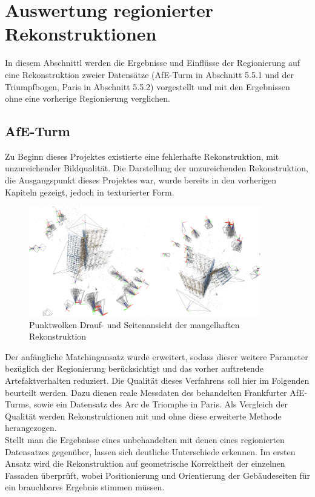 \section{Auswertung regionierter Rekonstruktionen}

In diesem Abschnittl werden die Ergebnisse und Einfl\"usse der Regionierung  auf eine Rekonstruktion zweier Datens\"atze (AfE-Turm in Abschnitt 5.5.1 und der Triumpfbogen, Paris in Abschnitt 5.5.2) vorgestellt und mit den Ergebnissen ohne eine vorherige Regionierung verglichen.

\subsection{AfE-Turm}
Zu Beginn dieses Projektes existierte eine fehlerhafte Rekonstruktion, mit unzureichender Bildqualit\"at. Die Darstellung der unzureichenden Rekonstruktion, die Ausgangspunkt dieses Projektes war, wurde bereits in den vorherigen Kapiteln gezeigt, jedoch in texturierter Form.

\begin{figure}[h]
\centering
\includegraphics[width=0.9\textwidth]{gfx/Evaluation/prePointcloud_AfEboth.png}
\caption[Punktwolken Drauf- und Seitenansicht der mangelhaften Rekonstruktion]{Punktwolken Drauf- und Seitenansicht der mangelhaften Rekonstruktion}
\label{gr:seitefehler}
\end{figure}
\FloatBarrier

Der anf\"angliche Matchingansatz wurde erweitert, sodass dieser weitere Parameter bez\"uglich der Regionierung ber\"ucksichtigt und das vorher auftretende Artefaktverhalten reduziert. Die Qualit\"at dieses Verfahrens soll hier im Folgenden beurteilt werden. Dazu dienen reale Messdaten des behandelten Frankfurter AfE-Turms, sowie ein Datensatz des Arc de Triomphe in Paris. Als Vergleich der Qualit\"at werden Rekonstruktionen mit und ohne diese erweiterte Methode herangezogen. \\
Stellt man die Ergebnisse eines unbehandelten mit denen eines regionierten Datensatzes gegen\"uber, lassen sich deutliche Unterschiede erkennen. Im ersten Ansatz wird die Rekonstruktion auf geometrische Korrektheit der einzelnen Fassaden \"uberpr\"uft, wobei Positionierung und Orientierung der Geb\"audeseiten f\"ur ein brauchbares Ergebnis stimmen m\"ussen. 

